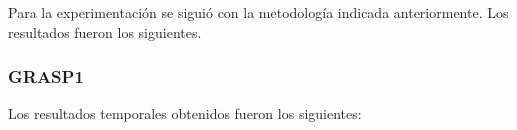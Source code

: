 

Para la experimentación se siguió con la metodología indicada anteriormente. Los resultados fueron los siguientes.

\subsubsection{GRASP1}

Los resultados temporales obtenidos fueron los siguientes:

